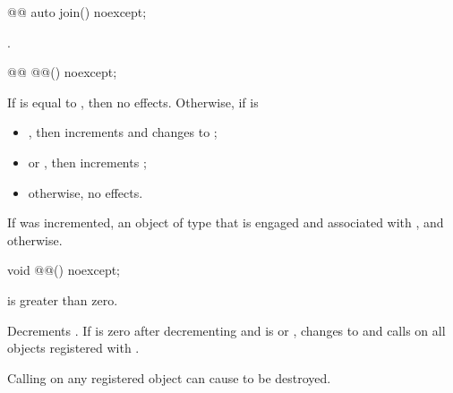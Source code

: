 %
\begin{itemdecl}
@@ auto join() noexcept;
\end{itemdecl}

\begin{itemdescr}
\pnum
\returns
{}.
\end{itemdescr}

%
\begin{itemdecl}
@@ @@() noexcept;
\end{itemdecl}

\begin{itemdescr}
\pnum
\effects
If  is equal to , then no effects.
Otherwise, if  is
\begin{itemize}
\item
{},
then increments  and changes  to ;
\item
{} or ,
then increments ;
\item
otherwise, no effects.
\end{itemize}

\pnum
\returns
If  was incremented,
an object of type 
that is engaged and associated with , and
 otherwise.
\end{itemdescr}

%
\begin{itemdecl}
void @@() noexcept;
\end{itemdecl}

\begin{itemdescr}
\pnum
\expects
{} is greater than zero.

\pnum
\effects
Decrements .
If  is zero after decrementing and
 is  or ,
changes  to  and
calls  on all objects registered with .
\begin{note}
Calling  on any registered object
can cause  to be destroyed.
\end{note}
\end{itemdescr}

